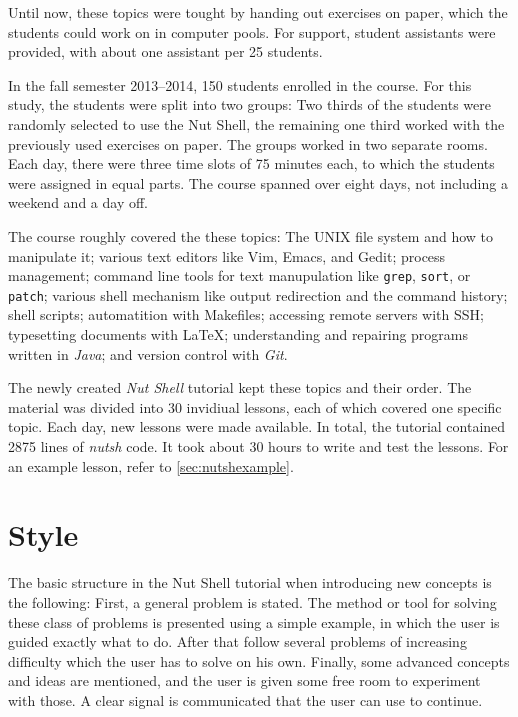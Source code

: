 \documentclass[paper=a4,twoside,abstract=on,cleardoublepage=empty,numbers=noenddot,toc=bib,12pt,appendixprefix=true]{scrreprt}
\begin{document}
Until now, these topics were tought by handing out exercises on paper, which the students could work on in computer pools. For support, student assistants were provided, with about one assistant per 25 students.

In the fall semester 2013--2014, 150 students enrolled in the course. For this study, the students were split into two groups: Two thirds of the students were randomly selected to use the Nut Shell, the remaining one third worked with the previously used exercises on paper. The groups worked in two separate rooms. Each day, there were three time slots of 75 minutes each, to which the students were assigned in equal parts. The course spanned over eight days, not including a weekend and a day off.

The course roughly covered the these topics: The \textsc{UNIX} file system and how to manipulate it; various text editors like Vim, Emacs, and Gedit; process management; command line tools for text manupulation like \texttt{grep}, \texttt{sort}, or \texttt{patch}; various shell mechanism like output redirection and the command history; shell scripts; automatition with Makefiles; accessing remote servers with \textsc{SSH}; typesetting documents with \LaTeX; understanding and repairing programs written in \textit{Java}; and version control with \textit{Git}.

The newly created \textit{Nut Shell} tutorial kept these topics and their order. The material was divided into 30 invidiual lessons, each of which covered one specific topic. Each day, new lessons were made available. In total, the tutorial contained 2875 lines of \textit{nutsh} code. It took about 30 hours to write and test the lessons. For an example lesson, refer to \cref{sec:nutshexample}.

\section{Style}

The basic structure in the Nut Shell tutorial when introducing new concepts is the following: First, a general problem is stated. The method or tool for solving these class of problems is presented using a simple example, in which the user is guided exactly what to do. After that follow several problems of increasing difficulty which the user has to solve on his own. Finally, some advanced concepts and ideas are mentioned, and the user is given some free room to experiment with those. A clear signal is communicated that the user can use to continue.
\end{document}
